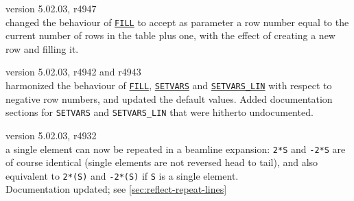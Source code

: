 \begin{madlist}
  
   version 5.02.03, r4947 \\
  changed the behaviour of \hyperref[sec:fill]{\texttt{FILL}} to accept as
  parameter a row number equal to the current number of rows in the
  table plus one, with the effect of creating a new row and filling it. 
  
  
   version 5.02.03, r4942 and r4943\\
  harmonized the behaviour of \hyperref[sec:fill]{\texttt{FILL}},
  \hyperref[sec:setvars]{\texttt{SETVARS}} and
  \hyperref[sec:setvars-lin]{\texttt{SETVARS\_LIN}} with respect to
  negative row numbers, and updated the default values. Added
  documentation sections for \texttt{SETVARS} and \texttt{SETVARS\_LIN}
  that were hitherto undocumented.   
  
  
   version 5.02.03, r4932 \\
  a single element can now be repeated in a beamline expansion:
  \texttt{2*S} and \texttt{-2*S} are of course identical (single
  elements are not reversed head to tail), and also equivalent to
  \texttt{2*(S)} and \texttt{-2*(S)} if \texttt{S} is a single
  element.\\
  Documentation updated; see \ref{sec:reflect-repeat-lines}


\end{madlist}
  


\newpage

